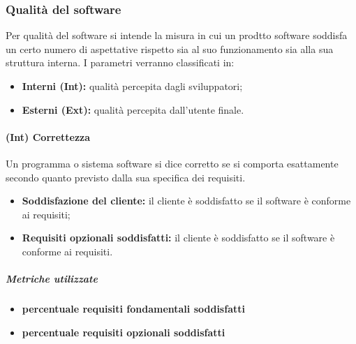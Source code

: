 \subsubsection{Qualità del software}
Per qualità del software si intende la misura in cui un prodtto software soddisfa un certo numero di aspettative rispetto sia al suo funzionamento sia alla sua struttura interna. I parametri verranno classificati in:
\begin{itemize}
	\item{\textbf{Interni (Int):} qualità percepita dagli sviluppatori;}
	\item{\textbf{Esterni (Ext):} qualità percepita dall'utente finale.}
\end{itemize}
\paragraph{\textbf{(Int) Correttezza}}
Un programma o sistema software si dice corretto se si comporta esattamente secondo quanto previsto dalla sua specifica dei requisiti.
\begin{itemize}
	\item \textbf{Soddisfazione del cliente:} il cliente è soddisfatto se il software è conforme ai requisiti;
	\item \textbf{Requisiti opzionali soddisfatti:} il cliente è soddisfatto se il software è conforme ai requisiti.
\end{itemize}
\subparagraph{Metriche utilizzate}
\begin{itemize}
	\item \textbf{percentuale requisiti fondamentali soddisfatti}
	\item \textbf{percentuale requisiti opzionali soddisfatti}
\end{itemize}
\begin{table}[!htpb]
	\centering
	\renewcommand{\arraystretch}{2} 
	\caption{Metriche utilizzate per la Correttezza}
\end{table}
